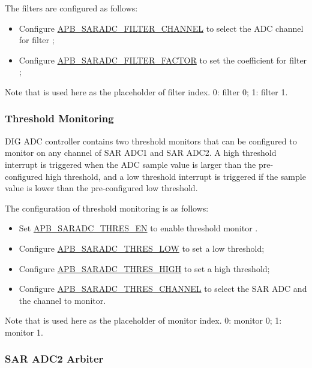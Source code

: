 \documentclass[main\_\_EN.tex]{subfiles}
\begin{document}
The filters are configured as follows:
\begin{itemize}
\item Configure \hyperref[fielddesc:APBSARADCAPBSARADCFILTERCHANNEL1]{APB\_SARADC\_FILTER\_CHANNEL} to select the ADC channel for filter ;
\item Configure \hyperref[fielddesc:APBSARADCAPBSARADCFILTERCHANNEL1]{APB\_SARADC\_FILTER\_FACTOR} to set the coefficient for filter ;
\end{itemize}

Note that  is used here as the placeholder of filter index. 0: filter 0; 1: filter 1.

\subsubsection{Threshold Monitoring}
DIG ADC controller contains two threshold monitors that can be configured to monitor on any channel of SAR ADC1 and SAR ADC2. A high threshold interrupt is triggered when the ADC sample value is larger than the pre-configured high threshold, and a low threshold interrupt is triggered if the sample value is lower than the pre-configured low threshold.

The configuration of threshold monitoring is as follows:
\begin{itemize}
    \item Set \hyperref[fielddesc:APBSARADCAPBSARADCTHRESALLEN]{APB\_SARADC\_THRES\_EN} to enable threshold monitor .
    \item Configure \hyperref[fielddesc:APBSARADCAPBSARADCTHRES1LOW]{APB\_SARADC\_THRES\_LOW} to set a low threshold;
    \item Configure \hyperref[fielddesc:APBSARADCAPBSARADCTHRES1LOW]{APB\_SARADC\_THRES\_HIGH} to set a high threshold;
    \item Configure \hyperref[fielddesc:APBSARADCAPBSARADCTHRES1LOW]{APB\_SARADC\_THRES\_CHANNEL} to select the SAR ADC and the channel to monitor.
\end{itemize}

Note that  is used here as the placeholder of monitor index. 0: monitor 0; 1: monitor 1.

\subsubsection{SAR ADC2 Arbiter}
\end{document}
